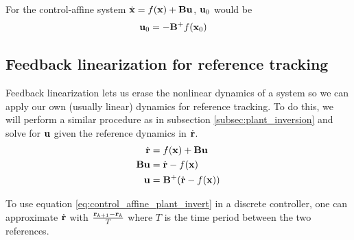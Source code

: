 For the control-affine \gls{system}
$\dot{\mathbf{x}} = f(\mathbf{x}) + \mathbf{B}\mathbf{u}$, $\mathbf{u}_0$ would be
\begin{align}
  \mathbf{u}_0 &= -\mathbf{B}^+ f(\mathbf{x}_0)
\end{align}

\subsection{Feedback linearization for reference tracking}

Feedback linearization lets us erase the nonlinear dynamics of a system so we
can apply our own (usually linear) dynamics for \gls{reference} tracking. To do
this, we will perform a similar procedure as in subsection
\ref{subsec:plant_inversion} and solve for $\mathbf{u}$ given the \gls{reference}
dynamics in $\dot{\mathbf{r}}$.
\begin{align}
  \dot{\mathbf{r}} &= f(\mathbf{x}) + \mathbf{B}\mathbf{u} \nonumber \\
  \mathbf{B}\mathbf{u} &= \dot{\mathbf{r}} - f(\mathbf{x}) \nonumber \\
  \mathbf{u} &= \mathbf{B}^+ (\dot{\mathbf{r}} - f(\mathbf{x}))
    \label{eq:control_affine_plant_invert}
\end{align}
\begin{remark}
  To use equation \eqref{eq:control_affine_plant_invert} in a discrete
  controller, one can approximate $\dot{\mathbf{r}}$ with
  $\frac{\mathbf{r}_{k + 1} - \mathbf{r}_k}{T}$ where $T$ is the time period between
  the two \glspl{reference}.
\end{remark}
